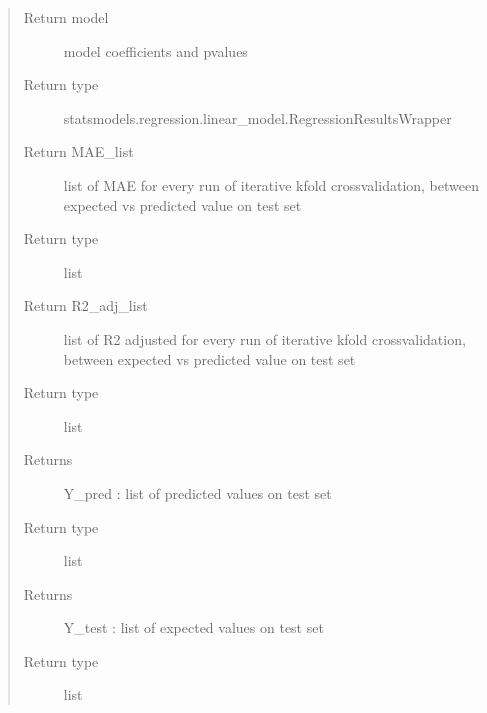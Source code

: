 \documentclass[letterpaper,10pt,english]{sphinxmanual}
\begin{document}
\begin{fulllineitems}
\begin{quote}
\begin{description}
\item[{Return model}] \leavevmode
\sphinxAtStartPar
model coefficients and p\sphinxhyphen{}values

\item[{Return type}] \leavevmode
\sphinxAtStartPar
statsmodels.regression.linear\_model.RegressionResultsWrapper

\item[{Return MAE\_list}] \leavevmode
\sphinxAtStartPar
list of MAE for every run of iterative k\sphinxhyphen{}fold crossvalidation, between expected vs predicted value on test set

\item[{Return type}] \leavevmode
\sphinxAtStartPar
list

\item[{Return R2\_adj\_list}] \leavevmode
\sphinxAtStartPar
list of R2 adjusted for every run of iterative k\sphinxhyphen{}fold crossvalidation, between expected vs predicted value on test set

\item[{Return type}] \leavevmode
\sphinxAtStartPar
list

\item[{Returns}] \leavevmode
\sphinxAtStartPar
Y\_pred : list of predicted values on test set

\item[{Return type}] \leavevmode
\sphinxAtStartPar
list

\item[{Returns}] \leavevmode
\sphinxAtStartPar
Y\_test : list of expected values on test set

\item[{Return type}] \leavevmode
\sphinxAtStartPar
list

\end{description}\end{quote}

\end{fulllineitems}

\end{document}
